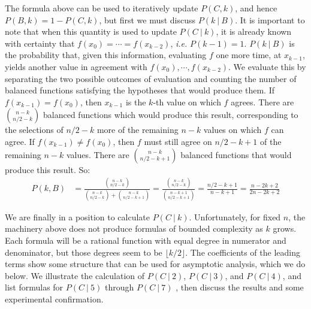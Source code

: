 The formula above can be used to iteratively update $P(C,k)$, and hence $P(B,k)=1-P(C,k)$, but first we must discuss $P(k\ |\ B)$.  It is important to note that when this quantity is used to update $P(C\ |\ k)$, it is already known with certainty that $f(x_0) = \cdots = f(x_{k-2})$, \textit{i.e.} $P(k-1) = 1$.  $P(k\ |\ B)$ is the probability that, given this information, evaluating $f$ one more time, at $x_{k-1}$, yields another value in agreement with $f(x_0),\cdots,f(x_{k-2})$.   We evaluate this by separating the two possible outcomes of evaluation and counting the number of balanced functions satisfying the hypotheses that would produce them.   If $f(x_{k-1}) =  f(x_0)$, then $x_{k-1}$ is the $k$-th value on which $f$ agrees.  There are $\binom{n-k}{n/2-k}$ balanced functions which would produce this result, corresponding to the selections of $n/2-k$ more of the remaining $n-k$ values on which $f$ can agree.  If $f(x_{k-1})\neq f(x_0)$, then $f$ must still agree on $n/2-k+1$ of the remaining $n-k$ values.  There are $\binom{n-k}{n/2-k+1}$ balanced functions that would produce this result. So:
\begin{align*}
P(k,B)&=\frac{\binom{n-k}{n/2-k}}{\binom{n-k}{n/2-k}+\binom{n-k}{n/2-k+1}} = \frac{\binom{n-k}{n/2-k}}{\binom{n-k+1}{n/2-k+1}} =  \frac{n/2-k+1}{n-k+1} = \frac{n-2k+2}{2n-2k+2}
\end{align*}

We are finally in a position to calculate $P(C\ |\ k)$.  Unfortunately, for fixed $n$, the machinery above does not produce formulas of bounded complexity as $k$ grows.  Each formula will be a rational function with equal degree in numerator and denominator, but those degrees seem to be $\lfloor k/2\rfloor$.  The coefficients of the leading terms show some structure that can be used for asymptotic analysis, which we do below.  We illustrate the calculation of $P(C\ |\ 2)$, $P(C\ |\ 3)$, and $P(C\ |\ 4)$, and list formulas for $P(C\ |\ 5)$ through $P(C\ |\ 7)$ ,  then discuss the results and some experimental confirmation.

